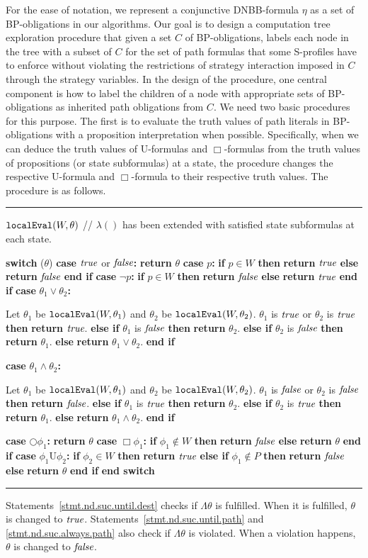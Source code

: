 \documentclass[11pt]{article}
\makeatletter
\newcommand{\IFNLINE}[1]{\STATE {\bf if} #1 {\bf then} }
\newcommand{\IFLINE}[1]{{\bf if} #1 {\bf then} }
\newcommand{\ELSELINE}{\textbf{else} }
\newcommand{\ENDIFLINE}{\textbf{end if}}
\newcommand{\ENDIFNLINE}{\STATE \textbf{end if}}
\newcommand{\ELSIFLINE}[1]{\textbf{else if} #1 {\bf then}}
\newcommand{\ELSIFNLINE}[1]{\STATE \textbf{else if} #1 {\bf then}}
\newcommand{\RETLINE}{\textbf{return} }
\newcommand{\SWITCH}[1]{\STATE \textbf{switch} (#1)}
\newcommand{\ENDSWITCH}{\STATE \textbf{end switch}}
\newcommand{\CASE}[1]{\STATE \textbf{case} #1\textbf{:} \begin{ALC@g}}
\newcommand{\ENDCASE}{\end{ALC@g}}
\newcommand{\CASELINE}[1]{\STATE \textbf{case} #1\textbf{:} }
\newcommand{\procbegin}{\vspace*{3mm}\hrule\noindent}
\newcommand{\procend}{\vspace*{1mm}\hrule\vspace{3mm}}
\newcommand{\tteval}{\mbox{\tt localEval}}
\newcommand{\true}{\mbox{\em true}}
\newcommand{\false}{\mbox{\em false}}
\newcommand{\pfrr}{\Box}
\newcommand{\until}{\textrm{U}} %
\newcommand{\nxt}{\bigcirc}
\makeatother
\begin{document}
For the ease of notation, we represent 
a conjunctive DNBB-formula $\eta$ as a set of BP-obligations in our algorithms.  
Our goal is to design a computation tree exploration procedure
that given a set $C$ of BP-obligations, 
labels each node in the tree with a subset of $C$
for the set of path formulas that some S-profiles
have to enforce without violating the restrictions of strategy
interaction imposed in $C$ through the strategy variables.
In the design of the procedure, one central component is
how to label the children of a node with appropriate sets of BP-obligations 
as inherited path obligations from $C$. 
We need two basic procedures for this purpose. 
The first is to evaluate the truth values of path literals in 
BP-obligations with a proposition interpretation when possible. 
Specifically, when we can deduce the truth values of 
$\until$-formulas and $\pfrr$-formulas from the truth values of propositions (or state subformulas) at a state, 
the procedure changes the respective $\until$-formula and $\pfrr$-formula to their  respective truth values. 
The procedure is as follows. 
\procbegin 
$\tteval(W,\theta)$ // $\lambda()$ has been extended with 
			satisfied state subformulas at each state. 
\begin{algorithmic}[1]
\SWITCH {$\theta$} 
\CASELINE {$\true$ or $\false$} 
  \RETLINE $\theta$
\CASELINE {$p$} 
  \IFLINE {$p\in W$} \RETLINE $\true$ 
  \ELSELINE \RETLINE $\false$ 
  \ENDIFLINE   
\CASELINE {$\neg p$} 
  \IFLINE {$p\in W$} \RETLINE $\false$ 
  \ELSELINE \RETLINE $\true$  
  \ENDIFLINE   
\CASE {$\theta_1\vee\theta_2$} 
  \STATE Let $\theta_1$ be $\tteval(W,\theta_1)$ and 
    $\theta_2$ be $\tteval(W,\theta_2)$. 
  \IFNLINE {$\theta_1$ is $\true$ or $\theta_2$ is $\true$} 
    \RETLINE $\true$. 
  \ELSIFNLINE {$\theta_1$ is $\false$}
    \RETLINE $\theta_2$. 
  \ELSIFLINE {$\theta_2$ is $\false$} 
    \RETLINE $\theta_1$. 
  \ELSELINE 
    \RETLINE $\theta_1\vee\theta_2$. 
  \ENDIFNLINE 
\ENDCASE
\CASE {$\theta_1\wedge\theta_2$} 
  \STATE Let $\theta_1$ be $\tteval(W,\theta_1)$ and 
    $\theta_2$ be $\tteval(W,\theta_2)$. 
  \IFNLINE {$\theta_1$ is $\false$ or $\theta_2$ is $\false$} 
    \RETLINE $\false$. 
  \ELSIFNLINE {$\theta_1$ is $\true$}
    \RETLINE $\theta_2$. 
  \ELSIFLINE {$\theta_2$ is $\true$} 
    \RETLINE $\theta_1$. 
  \ELSELINE 
    \RETLINE $\theta_1\wedge\theta_2$. 
  \ENDIFNLINE  
\ENDCASE 
\CASELINE {$\nxt\phi_1$} 
  \RETLINE $\theta$
\CASELINE {$\pfrr\phi_1$} \label{stmt.nd.suc.always.path}
  \IFLINE {$\phi_1\not\in W$} 
    \RETLINE $\false$ 
  \ELSELINE 
    \RETLINE $\theta$
  \ENDIFLINE 
\CASELINE {$\phi_1\until\phi_2$} 
  \IFLINE {$\phi_2\in W$} \label{stmt.nd.suc.until.dest}
    \RETLINE $\true$
  \ELSIFLINE {$\phi_1\not\in P$}\label{stmt.nd.suc.until.path}
    \RETLINE $\false$
  \ELSELINE
    \RETLINE $\theta$
  \ENDIFLINE 
\ENDSWITCH 
\end{algorithmic}
\procend 
Statements~\ref{stmt.nd.suc.until.dest} 
checks if $\Lambda\theta$ is fulfilled.
When it is fulfilled, 
$\theta$ is changed to $\true$.   
Statements~\ref{stmt.nd.suc.until.path} 
and \ref{stmt.nd.suc.always.path} also 
check if $\Lambda\theta$ is violated.
When a violation happens, 
$\theta$ is changed to $\false$.   
\end{document}
